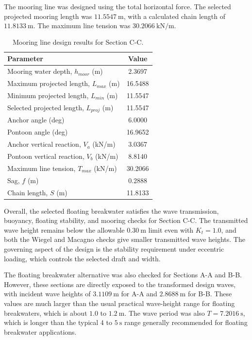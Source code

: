 \documentclass[a4paper, 11pt]{article}
\begin{document}
The mooring line was designed using the total horizontal force. The selected projected mooring length was \(11.5547~\mathrm{m}\), with a calculated chain length of \(11.8133~\mathrm{m}\). The maximum line tension was \(30.2066~\mathrm{kN/m}\).

\begin{table}[H]
\centering
\caption{Mooring line design results for Section C-C.}
\label{tab:floating_mooring}
\begin{tabular}{l c}
\hline
Parameter & Value \\
\hline
Mooring water depth, \(h_{moor}\) (m) & 2.3697 \\
Maximum projected length, \(L_{max}\) (m) & 16.5488 \\
Minimum projected length, \(L_{min}\) (m) & 11.5547 \\
Selected projected length, \(L_{proj}\) (m) & 11.5547 \\
Anchor angle (deg) & 6.0000 \\
Pontoon angle (deg) & 16.9652 \\
Anchor vertical reaction, \(V_a\) (kN/m) & 3.0367 \\
Pontoon vertical reaction, \(V_b\) (kN/m) & 8.8140 \\
Maximum line tension, \(T_{max}\) (kN/m) & 30.2066 \\
Sag, \(f\) (m) & 0.2888 \\
Chain length, \(S\) (m) & 11.8133 \\
\hline
\end{tabular}
\end{table}

Overall, the selected floating breakwater satisfies the wave transmission, buoyancy, floating stability, and mooring checks for Section C-C. The transmitted wave height remains below the allowable \(0.30~\mathrm{m}\) limit even with \(K_t=1.0\), and both the Wiegel and Macagno checks give smaller transmitted wave heights. The governing aspect of the design is the stability requirement under eccentric loading, which controls the selected draft and width.

The floating breakwater alternative was also checked for Sections A-A and B-B. However, these sections are directly exposed to the transformed design waves, with incident wave heights of \(3.1109~\mathrm{m}\) for A-A and \(2.8688~\mathrm{m}\) for B-B. These values are much larger than the usual practical wave-height range for floating breakwaters, which is about \(1.0\) to \(1.2~\mathrm{m}\). The wave period was also \(T=7.2016~\mathrm{s}\), which is longer than the typical \(4\) to \(5~\mathrm{s}\) range generally recommended for floating breakwater applications.
\end{document}
